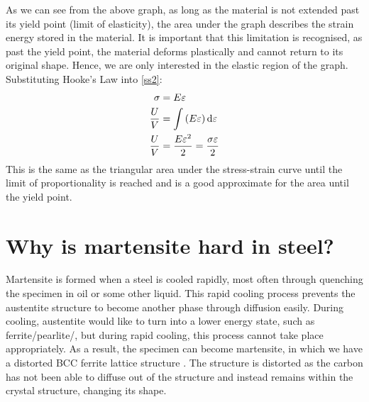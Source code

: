 \documentclass[11pt]{article}
\begin{document}
As we can see from the above graph, as long as the material is not extended past its yield point (limit of elasticity), the area under the graph describes the strain energy stored in the material. It is important that this limitation is recognised, as past the yield point, the material deforms plastically and cannot return to its original shape. Hence, we are only interested in the elastic region of the graph. Substituting Hooke's Law into \ref{ss2}:
\begin{align}
    \sigma &= E\varepsilon\\
    \frac{U}{V} &= \int\left(E\varepsilon\right)\dif \varepsilon\\
    \frac{U}{V} &= \frac{E\varepsilon^2}{2} = \frac{\sigma\varepsilon}{2}
\end{align}
This is the same as the triangular area under the stress-strain curve until the limit of proportionality is reached and is a good approximate for the area until the yield point.
\section{Why is martensite hard in steel?}
Martensite is formed when a steel is cooled rapidly, most often through quenching the specimen in oil or some other liquid. This rapid cooling process prevents the austentite structure to become another phase through diffusion easily. During cooling, austentite would like to turn into a lower energy state, such as ferrite/pearlite/, but during rapid cooling, this process cannot take place appropriately. As a result, the specimen can become martensite, in which we have a distorted BCC ferrite lattice structure \cite{b1}. The structure is distorted as the carbon has not been able to diffuse out of the structure and instead remains within the crystal structure, changing its shape.
\end{document}
